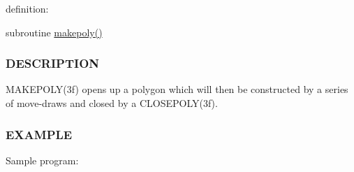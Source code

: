 definition\+:

subroutine \hyperlink{namespacem__pixel_ab7128437f95b40004bf73fc6e3f597f8}{makepoly()}

\subsubsection*{D\+E\+S\+C\+R\+I\+P\+T\+I\+ON}

M\+A\+K\+E\+P\+O\+L\+Y(3f) opens up a polygon which will then be constructed by a series of move-\/draws and closed by a C\+L\+O\+S\+E\+P\+O\+L\+Y(3f).

\subsubsection*{E\+X\+A\+M\+P\+LE}

Sample program\+:

